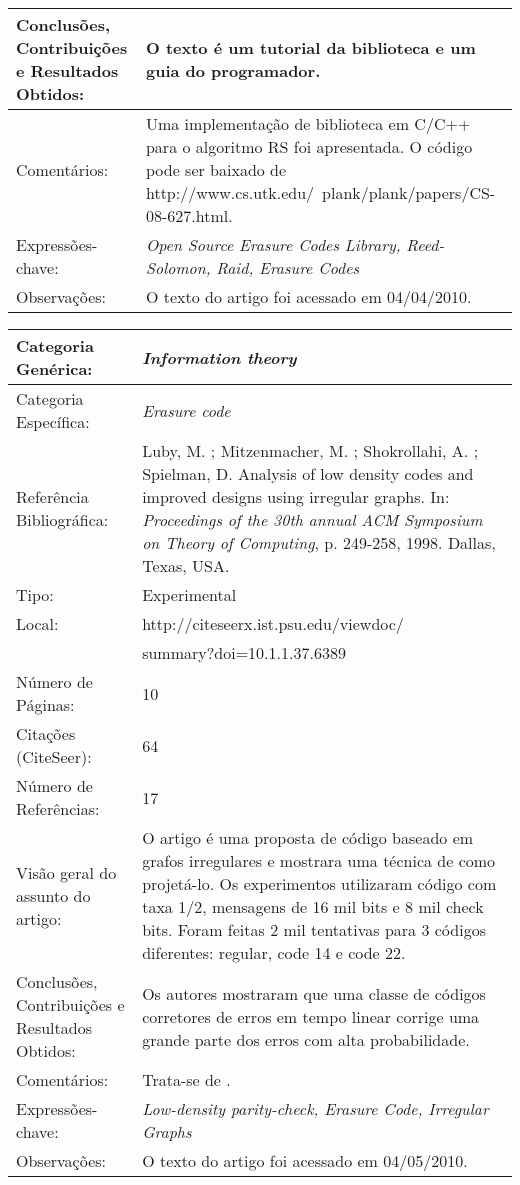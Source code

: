 \documentclass[10pt,a4paper]{article}
\begin{document}
\begin{center}
\begin{tabular}{|p{5cm}||p{10cm}|}
Conclusões, Contribuições e Resultados Obtidos: &  O texto é um tutorial da biblioteca e um guia do programador. \\\hline
Comentários: & Uma implementação de biblioteca em C/C++ para o algoritmo RS foi apresentada. O código pode ser baixado de http://www.cs.utk.edu/~plank/plank/papers/CS-08-627.html. \\\hline
Expressões-chave: & \emph{Open Source Erasure Codes Library, Reed-Solomon, Raid, Erasure Codes}\\\hline
Observações: &  O texto do artigo foi acessado em 04/04/2010.\\\hline

\end{tabular}
\end{center}

\begin{center}
\begin{tabular}{|p{5cm}||p{10cm}|}
\hline

Categoria Genérica: & \emph{Information theory}\\\hline
Categoria Específica: & \emph{Erasure code}\\\hline
Referência Bibliográfica: & Luby, M. ; Mitzenmacher, M. ; Shokrollahi, A. ; Spielman, D. Analysis of low density codes and improved designs using irregular graphs. In:  \emph{Proceedings of the 30th annual ACM Symposium on Theory of Computing}, p. 249-258, 1998. Dallas, Texas, USA. \\\hline
Tipo: & Experimental\\\hline
Local: & http://citeseerx.ist.psu.edu/viewdoc/\\ &summary?doi=10.1.1.37.6389\\\hline
Número de Páginas: & 10\\\hline
Citações (CiteSeer): & 64\\\hline
Número de Referências: & 17\\\hline
Visão geral do assunto do artigo: & O artigo é uma proposta de código baseado em grafos irregulares e mostrara uma técnica de como projetá-lo. Os experimentos utilizaram código com taxa 1/2, mensagens de 16 mil bits e 8 mil check bits. Foram feitas 2 mil tentativas para 3 códigos diferentes: regular, code 14 e code 22. \\\hline
Conclusões, Contribuições e Resultados Obtidos: &  Os autores mostraram que uma classe de códigos corretores de erros em tempo linear corrige uma grande parte dos erros com alta probabilidade. \\\hline
Comentários: & Trata-se de . \\\hline
Expressões-chave: & \emph{Low-density parity-check, Erasure Code, Irregular Graphs}\\\hline
Observações: &  O texto do artigo foi acessado em 04/05/2010.\\\hline

\end{tabular}
\end{center}
\end{document}
